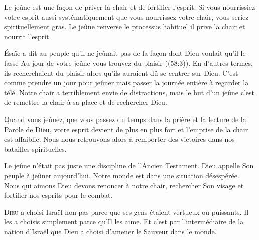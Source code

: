 Le jeûne est une fa\c{c}on de priver la chair et de fortifier l'esprit.
 Si vous nourrissiez votre esprit aussi systématiquement
 que vous nourrissez votre chair, vous seriez spirituellement gras.
 Le jeûne renverse le processus habituel
 \ocadr il prive la chair et nourrit l'esprit. 


Ésaïe a dit au peuple qu'il ne jeûnait pas de la fa\c{c}on dont Dieu
 voulait qu'il le fasse\frcolon{}
 \Og Au jour de votre jeûne vous trouvez du plaisir \Fg{}
 ((58:3)). En d'autres termes, ils recherchaient du plaisir
 alors qu'ils auraient dû se centrer sur Dieu. C'est comme prendre
 un jour pour jeûner mais passer la journée entière à regarder la télé.
 Notre chair a terriblement envie de distractions, mais le but d'un jeûne
 c'est de remettre la chair à sa place et de rechercher Dieu. 

Quand vous jeûnez, que vous passez du temps dans la prière
 et la lecture de la Parole de Dieu, votre esprit devient de plus en plus
 fort et l'emprise de la chair est affaiblie. Nous nous retrouvons alors
 à remporter des victoires dans nos batailles spirituelles. 

Le jeûne n'était pas juste une discipline de l'Ancien Testament.
 Dieu appelle Son peuple à jeûner aujourd'hui.
 Notre monde est dans une situation désespérée.
 Nous qui aimons Dieu devons renoncer à notre chair,
 rechercher Son visage et fortifier nos esprits pour le combat. 

\dvrule






\lettrine{D}{ieu} a choisi Israël \ocadr non pas parce que ses gens
 étaient vertueux ou puissants. Il les a choisis simplement parce
 qu'Il les aime. Et c'est par l'intermédiaire de la nation d'Israël
 que Dieu a choisi d'amener le Sauveur dans le monde. 


